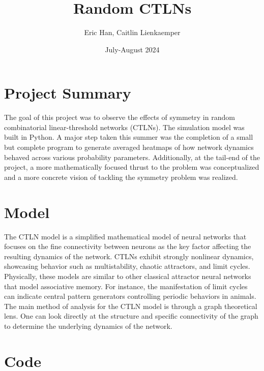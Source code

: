 \documentclass{article}
\title{Random CTLNs}
\author{Eric Han, Caitlin Lienkaemper}
\date{July-August 2024}
\theoremstyle{definition}
\theoremstyle{remark}
\begin{document}
\maketitle

\section{Project Summary}
The goal of this project was to observe the effects of symmetry in random combinatorial linear-threshold networks (CTLNs). The simulation model was built in Python. A major step taken this summer was the completion of a small but complete program to generate averaged heatmaps of how network dynamics behaved across various probability parameters. Additionally, at the tail-end of the project, a more mathematically focused thrust to the problem was conceptualized and a more concrete vision of tackling the symmetry problem was realized.

\section{Model}
The CTLN model is a simplified mathematical model of neural networks that focuses on the fine connectivity between neurons as the key factor affecting the resulting dynamics of the network. CTLNs exhibit strongly nonlinear dynamics, showcasing behavior such as multistability, chaotic attractors, and limit cycles. Physically, these models are similar to other classical attractor neural networks that model associative memory. For instance, the manifestation of limit cycles can indicate central pattern generators controlling periodic behaviors in animals. The main method of analysis for the CTLN model is through a graph theoretical lens. One can look directly at the structure and specific connectivity of the graph to determine the underlying dynamics of the network.



\section{Code}
\end{document}
